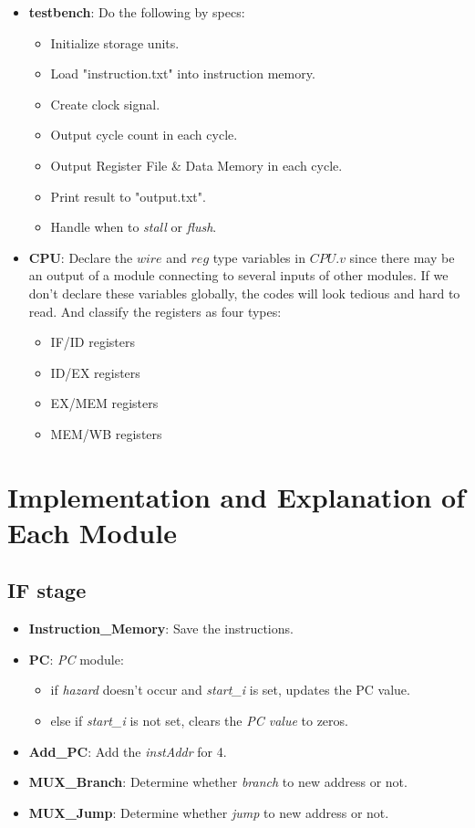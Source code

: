 \documentclass{article}
\begin{document}
\begin{itemize}
    \item \textbf{testbench}: Do the following by specs:
    \begin{itemize}
        \item Initialize storage units.
        \item Load "instruction.txt" into instruction memory.
        \item Create clock signal.
        \item Output cycle count in each cycle.
        \item Output Register File \& Data Memory in each cycle.
        \item Print result to "output.txt".
        \item Handle when to \textit{stall} or \textit{flush}.
    \end{itemize}

    \item \textbf{CPU}: Declare the $wire$ and $reg$ type variables in $CPU.v$ since there may be an output of a module connecting to several inputs of other modules. If we don't declare these variables globally, the codes will look tedious and hard to read. 
    And classify the registers as four types:
    \begin{itemize}
        \item IF/ID registers
        \item ID/EX registers
        \item EX/MEM registers
        \item MEM/WB registers
    \end{itemize}    
\end{itemize}

\newpage
\section{Implementation and Explanation of Each Module}
    \subsection*{IF stage}
    \begin{itemize}
        \item \textbf{Instruction\_Memory}: Save the instructions.
        \item \textbf{PC}: \textit{PC} module:
        \begin{itemize}
            \item if \textit{hazard} doesn't occur and \textit{start\_i} is set, updates the PC value.
            \item else if \textit{start\_i} is not set, clears the \textit{PC value} to zeros.
        \end{itemize}
        \item \textbf{Add\_PC}: Add the \textit{instAddr} for 4.
        \item \textbf{MUX\_Branch}: Determine whether \textit{branch} to new address or not.
        \item \textbf{MUX\_Jump}: Determine whether \textit{jump} to new address or not. 
    \end{itemize}
\end{document}
